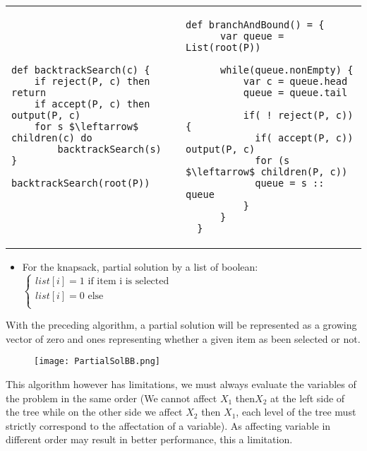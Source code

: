 \begin{tabular}{m{8cm}m{8cm}}
\begin{lstlisting}[mathescape, caption=BB with recursion]
def backtrackSearch(c) {
    if reject(P, c) then return
    if accept(P, c) then output(P, c)
    for s $\leftarrow$ children(c) do
        backtrackSearch(s)
}

backtrackSearch(root(P))
\end{lstlisting}
&
\begin{lstlisting}[mathescape, caption=BB with stack]
  def branchAndBound() = {
      var queue = List(root(P))

      while(queue.nonEmpty) {
          var c = queue.head
          queue = queue.tail

          if( ! reject(P, c)) {
            if( accept(P, c)) output(P, c)
            for (s $\leftarrow$ children(P, c))
            queue = s :: queue
          }
      }
  }
  \end{lstlisting}
\end{tabular}


\begin{itemize}
    \item For the knapsack, partial solution by a list of boolean: 
        $\begin{cases} 
            list[i]= 1 \text{ if item i is selected}\\
            list[i]= 0 \text{ else}\\
            \end{cases}$
        \end{itemize}



With the preceding algorithm, a partial solution will be represented as a growing vector
of zero and ones representing whether a given item as been selected or not.

\begin{figure}[!ht]
    \centering
    \texttt{[image: PartialSolBB.png]}
    \label{fig:Knapsack_example}
\end{figure}
\FloatBarrier

This algorithm however has limitations, we must always evaluate the variables of the 
problem in the same order (We cannot affect $X_1$ then$ X_2$ at the left side of the tree 
while on the other side we affect $X_2$ then $X_1$, each level of the tree must strictly 
correspond to the affectation of a variable). As affecting variable in different order may result in better performance, this a limitation.\newline

